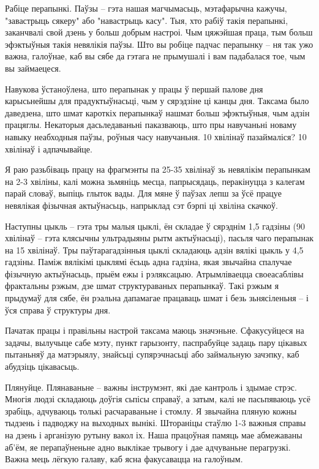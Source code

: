 Рабіце перапынкі. Паўзы – гэта нашая магчымасьць, мэтафарычна кажучы, "завастрыць сякеру" або "навастрыць касу". Тыя, хто рабіў такія перапынкі, заканчвалі свой дзень у больш добрым настроі. Чым цяжэйшая праца, тым больш эфэктыўныя такія невялікія паўзы. Што вы робіце падчас перапынку – ня так ужо важна, галоўнае, каб вы сябе да гэтага не прымушалі і вам падабалася тое, чым вы займаецеся.

Навукова ўстаноўлена, што перапынак у працы ў першай палове дня карысьнейшы для прадуктыўнасьці, чым у сярэдзіне ці канцы дня. Таксама было даведзена, што шмат кароткіх перапынкаў нашмат больш эфэктыўныя, чым адзін працяглы. Некаторыя дасьледаваньні паказваюць, што пры навучаньні новаму навыку неабходныя паўзы, роўныя часу навучаньня. 10 хвілінаў пазаймаліся? 10 хвілінаў і адпачывайце.

Я раю разьбіваць працу на фрагмэнты па 25-35 хвілінаў зь невялікім перапынкам на 2-3 хвіліны, калі можна зьмяніць месца, папрысядаць, перакінуцца з калегам парай словаў, выпіць глыток вады. Для мяне ў паўзах лепш за ўсё працуе невялікая фізычная актыўнасьць, напрыклад сэт бэрпі ці хвіліна скачкоў. 

Наступны цыкль – гэта тры малыя цыклі, ён складае ў сярэднім 1,5 гадзіны (90 хвілінаў – гэта клясычны ультрадыяны рытм актыўнасьці), пасьля чаго перапынак на 15 хвілінаў. Тры паўтарагадзінныя цыклі складаюць адзін вялікі цыкль у 4,5 гадзіны. Паміж вялікімі цыклямі ёсьць адна гадзіна, якая звычайна спалучае фізычную актыўнасьць, прыём ежы і рэляксацыю. Атрымліваецца своеасаблівы фрактальны рэжым, дзе шмат структураваных перапынкаў. Такі рэжым я прыдумаў для сябе, ён рэальна дапамагае працаваць шмат і безь зьнясіленьня – і ўся справа ў структуры дня.

Пачатак працы і правільны настрой таксама маюць значэньне. Сфакусуйцеся на задачы, вылучыце сабе мэту, пункт гарызонту, паспрабуйце задаць пару цікавых пытаньняў да матэрыялу, знайсьці супярэчнасьці або займальную зачэпку, каб абудзіць цікавасьць.

Плянуйце. Плянаваньне – важны інструмэнт, які дае кантроль і здымае стрэс. Многія людзі складаюць доўгія сьпісы справаў, а затым, калі не пасьпяваюць усё зрабіць, адчуваюць толькі расчараваньне і стомлу. Я звычайна пляную кожны тыдзень і падводжу на выходных вынікі. Штораніцы стаўлю 1-3 важныя справы на дзень і арганізую рутыну вакол іх. Наша працоўная памяць мае абмежаваны аб'ём, яе перапаўненьне адно выклікае трывогу і дае адчуваньне перагрузкі. Важна мець лёгкую галаву, каб ясна факусавацца на галоўным.

